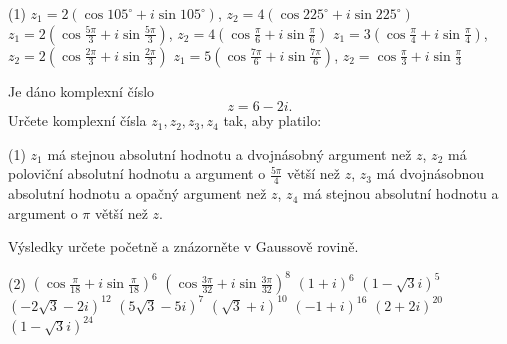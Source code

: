 \documentclass[12pt,a4paper]{article}
\begin{document}
\begin{exercise}
    \begin{tasks}(1)
        \task $z_1=2(\cos105^\circ+i\sin105^\circ)$, $z_2=4(\cos225^\circ+i\sin225^\circ)$
        \task $\displaystyle z_1=2\left(\cos\frac{5\pi}{3}+i\sin\frac{5\pi}{3}\right)$,
        $\displaystyle z_2=4\left(\cos\frac{\pi}{6}+i\sin\frac{\pi}{6}\right)$
        \task $\displaystyle z_1=3\left(\cos\frac{\pi}{4}+i\sin\frac{\pi}{4}\right)$,
        $\displaystyle z_2=2\left(\cos\frac{2\pi}{3}+i\sin\frac{2\pi}{3}\right)$
        \task $\displaystyle z_1=5\left(\cos\frac{7\pi}{6}+i\sin\frac{7\pi}{6}\right)$,
        $\displaystyle z_2=\cos\frac{\pi}{3}+i\sin\frac{\pi}{3}$
    \end{tasks}
\end{exercise}


\begin{exercise}
    Je dáno komplexní číslo
    \[
        z=6-2i.
    \]
    Určete komplexní čísla $z_1,z_2,z_3,z_4$ tak, aby platilo:

        \begin{tasks}(1)
            \task $z_1$ má stejnou absolutní hodnotu a dvojnásobný argument než $z$,
            \task $z_2$ má poloviční absolutní hodnotu a argument o $\frac{5\pi}{4}$ větší než $z$,
            \task $z_3$ má dvojnásobnou absolutní hodnotu a opačný argument než $z$,
            \task $z_4$ má stejnou absolutní hodnotu a argument o $\pi$ větší než $z$.
        \end{tasks}

        Výsledky určete početně a znázorněte v Gaussově rovině.
\end{exercise}


\begin{exercise}
    \begin{tasks}(2)
        \task $\displaystyle \left(\cos\frac{\pi}{18}+i\sin\frac{\pi}{18}\right)^6$
        \task $\displaystyle \left(\cos\frac{3\pi}{32}+i\sin\frac{3\pi}{32}\right)^8$
        \task $(1+i)^6$
        \task $(1-\sqrt3 i)^5$
        \task $(-2\sqrt3-2i)^{12}$
        \task $(5\sqrt3-5i)^7$
        \task $(\sqrt3+i)^{10}$
        \task $(-1+i)^{16}$
        \task $(2+2i)^{20}$
        \task $(1-\sqrt3 i)^{24}$
    \end{tasks}
\end{exercise}
\end{document}
